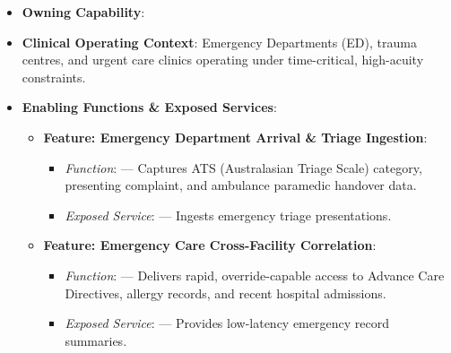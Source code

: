 \begin{itemize}

\item 
\textbf{Owning Capability}: \texttt{}



\item 
\textbf{Clinical Operating Context}: Emergency Departments (ED), trauma centres, and urgent care clinics operating under time-critical, high-acuity constraints.



\item 
\textbf{Enabling Functions \& Exposed Services}:


\begin{itemize}

\item 
\textbf{Feature: Emergency Department Arrival \& Triage Ingestion}:


\begin{itemize}

\item 
\emph{Function}: \texttt{} — Captures ATS (Australasian Triage Scale) category, presenting complaint, and ambulance paramedic handover data.



\item 
\emph{Exposed Service}: \texttt{} — Ingests emergency triage presentations.



\end{itemize}


\item 
\textbf{Feature: Emergency Care Cross-Facility Correlation}:


\begin{itemize}

\item 
\emph{Function}: \texttt{} — Delivers rapid, override-capable access to Advance Care Directives, allergy records, and recent hospital admissions.



\item 
\emph{Exposed Service}: \texttt{} — Provides low-latency emergency record summaries.



\end{itemize}



\end{itemize}
\end{itemize}
